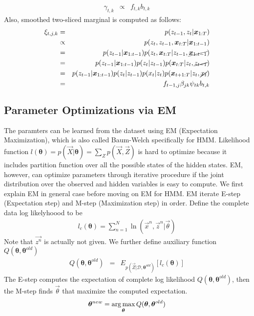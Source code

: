 \begin{eqnarray}
  \gamma_{t,k} &\propto& f_{t,k} b_{t,k}
\end{eqnarray}
Also, smoothed two-sliced marginal is computed as follows:
\begin{eqnarray}
  \xi_{t,j,k} 
  &=&  p(z_{t-1},z_t| \vec{x}_{1:T}) \nonumber \\
  &\propto& p(z_t, z_{t-1}, \vec{x}_{t:T}|\vec{x}_{1:t-1}) \nonumber \\
  &=& p(z_{t-1}|\mathbf{x}_{1:t-1})p(z_t, \mathbf{x}_{t:T}|z_{t-1}, \cancel{\mathbf{x}_{1:t-1}}) \nonumber \\
  &=& p(z_{t-1}|\mathbf{x}_{1:t-1})p(z_t|z_{t-1})p(\mathbf{x}_{t:T}|z_t, \cancel{z_{t-1}}) \nonumber \\
  &=& p(z_{t-1}|\mathbf{x}_{1:t-1})p(z_t|z_{t-1})p(x_t|z_t)p(\mathbf{x}_{t+1:T}|z_t, \cancel{x_t}) \nonumber \\
  &=& f_{t-1,j} \beta_{jk} \psi_{tk} b_{t,k}
\end{eqnarray}
\subsection{Parameter Optimizations via EM}
The paramters can be learned from the dataset using EM (Expectation Maximization), which is also called Baum-Welch specifically for HMM. Likelihood function $l(\mathbf{\theta}) = p(\vec{X} | \mathbf{\theta}) = \sum_Z p(\vec{X}, \vec{Z})$ is hard to optimize because it includes partition function over all the possible states of the hidden states. EM, however, can optimize parameters through iterative procedure if the joint distribution over the observed and hidden variables is easy to compute. We first explain EM in general case before moving on EM for HMM.
EM iterate E-step (Expectation step) and M-step (Maximization step) in order. Define the complete data log likelyhoood to be 
\begin{eqnarray}
l_c(\mathbf{\theta}) = \sum_{n=1}^N \ln(\vec{x}^n, \vec{z}^n | \vec{\theta})
\end{eqnarray}
Note that $\vec{z^n}$ is actually not given. We further define auxiliary function $Q(\mathbf{\theta}, \mathbf{\theta}^{old})$
\begin{eqnarray}
Q(\mathbf{\theta}, \mathbf{\theta}^{old}) &=& E_{p(\vec{Z}|\mathcal{D}, \mathbf{\theta}^{old})}[l_c(\mathbf{\theta})] 
\end{eqnarray}
The E-step computes the expectation of complete log likelihood $Q(\mathbf{\theta}, \mathbf{\theta}^{old})$, then the M-step finds $\vec{\theta}$ that maximize the computed expectation.
\begin{eqnarray}
\vec{\theta}^{new} = \argmax_{\vec{\theta}} Q(\mathbf{\theta}, \mathbf{\theta}^{old})
\end{eqnarray}

